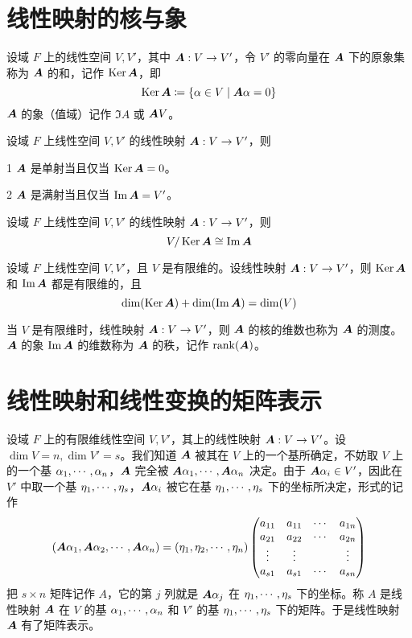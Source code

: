 \section{线性映射的核与象}

\begin{definition}[核] 
    设域 $F$ 上的线性空间 $V,V'$，其中 $\boldsymbol{A} : V \to V'$，令 $V'$ 的零向量在 $\boldsymbol{A}$ 下的原象集称为 $\boldsymbol{A}$ 的和，记作 $\operatorname{Ker} \boldsymbol{A}$，即
    \[ \operatorname{Ker} \boldsymbol{A} \coloneqq \{ \alpha \in V \mid \boldsymbol{A}\alpha = 0 \} \]
    $\boldsymbol{A}$ 的象（值域）记作 $\Im A$ 或 $\boldsymbol{A} V$。
\end{definition}

\begin{proposition}
    设域 $F$ 上线性空间 $V,V'$ 的线性映射 $\boldsymbol{A} : V \to V'$，则
    
    \num{1} $\boldsymbol{A}$ 是单射当且仅当 $\operatorname{Ker} \boldsymbol{A} = 0$。

    \num{2} $\boldsymbol{A}$ 是满射当且仅当 $\operatorname{Im} \boldsymbol{A} = V'$。
\end{proposition}

\begin{theorem}
    设域 $F$ 上线性空间 $V,V'$ 的线性映射 $\boldsymbol{A} : V \to V'$，则
    \[ V / \operatorname{Ker} \boldsymbol{A} \cong \operatorname{Im} \boldsymbol{A} \]
\end{theorem}

\begin{theorem}
    设域 $F$ 上线性空间 $V,V'$，且 $V$ 是有限维的。设线性映射 $\boldsymbol{A} : V \to V'$，则 $\operatorname{Ker} \boldsymbol{A}$ 和 $\operatorname{Im} \boldsymbol{A}$ 都是有限维的，且
    \[ \dim(\operatorname{Ker} \boldsymbol{A}) + \dim(\operatorname{Im} \boldsymbol{A}) = \dim(V) \]
\end{theorem}

当 $V$ 是有限维时，线性映射 $\boldsymbol{A} : V \to V'$，则 $\boldsymbol{A}$ 的核的维数也称为 $\boldsymbol{A}$ 的测度。$\boldsymbol{A}$ 的象 $\operatorname{Im} \boldsymbol{A}$ 的维数称为 $\boldsymbol{A}$ 的秩，记作 $\operatorname{rank}(\boldsymbol{A})$。

\section{线性映射和线性变换的矩阵表示}

设域 $F$ 上的有限维线性空间 $V,V'$，其上的线性映射 $\boldsymbol{A} : V \to V'$。设 $\dim V = n,\dim V' = s$。我们知道 $\boldsymbol{A}$ 被其在 $V$ 上的一个基所确定，不妨取 $V$ 上的一个基 $\alpha_1,\cdots,\alpha_n$，$\boldsymbol{A}$ 完全被 $\boldsymbol{A} \alpha_1,\cdots,\boldsymbol{A} \alpha_n$ 决定。由于 $\boldsymbol{A} \alpha_i \in V'$，因此在 $V'$ 中取一个基 $\eta_1,\cdots,\eta_s$，$\boldsymbol{A} \alpha_i$ 被它在基 $\eta_1,\cdots,\eta_s$ 下的坐标所决定，形式的记作
\[ 
    \left( \boldsymbol{A} \alpha_1 , \boldsymbol{A} \alpha_2 , \cdots , \boldsymbol{A} \alpha_n \right) = 
    \left( \eta_1 , \eta_2 , \cdots , \eta_n \right)
    \left( \begin{matrix}
        a_{11} & a_{11} & \cdots & a_{1n}\\
        a_{21} & a_{22} & \cdots & a_{2n}\\
        \vdots & \vdots &        & \vdots\\
        a_{s1} & a_{s1} & \cdots & a_{sn}
    \end{matrix} \right)
\]
把 $s\times n$ 矩阵记作 $A$，它的第 $j$ 列就是 $\boldsymbol{A} \alpha_j$ 在 $\eta_1,\cdots,\eta_s$ 下的坐标。称 $A$ 是线性映射 $\boldsymbol{A}$ 在 $V$ 的基 $\alpha_1,\cdots,\alpha_n$ 和 $V'$ 的基 $\eta_1,\cdots,\eta_s$ 下的矩阵。于是线性映射 $\boldsymbol{A}$ 有了矩阵表示。


